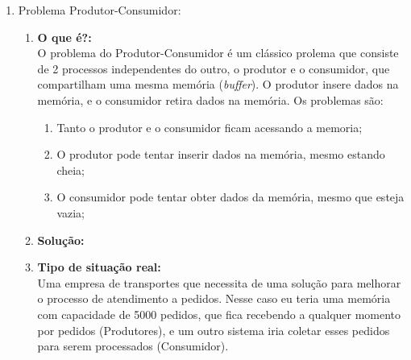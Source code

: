 \documentclass[a4paper, article]{article}
\begin{document}
\begin{enumerate}
\begin{enumerate}
            \end{enumerate}
        \item Problema Produtor-Consumidor:
            \begin{enumerate}
                \item\textbf{O que é?:}\\
                    O problema do Produtor-Consumidor é um clássico prolema que consiste de 2 processos
                    independentes do outro, o produtor e o consumidor, que compartilham uma mesma memória
                    (\textit{buffer}). O produtor insere dados na memória, e o consumidor retira dados na memória.
                    Os problemas são:
                    \begin{enumerate}
                        \item Tanto o produtor e o consumidor ficam acessando a memoria; 
                        \item O produtor pode tentar inserir dados na memória, mesmo estando cheia;
                        \item O consumidor pode tentar obter dados da memória, mesmo que esteja vazia;
                    \end{enumerate}
                \item\textbf{Solução:}\\
                \item\textbf{Tipo de situação real:}\\
                    Uma empresa de transportes que necessita de uma solução para melhorar o processo de
                    atendimento a pedidos. Nesse caso eu teria uma memória com capacidade de 5000 pedidos, que
                    fica recebendo a qualquer momento por pedidos (Produtores), e um outro sistema iria coletar esses
                    pedidos para serem processados (Consumidor).
            \end{enumerate}
    \end{enumerate}
\end{document}
